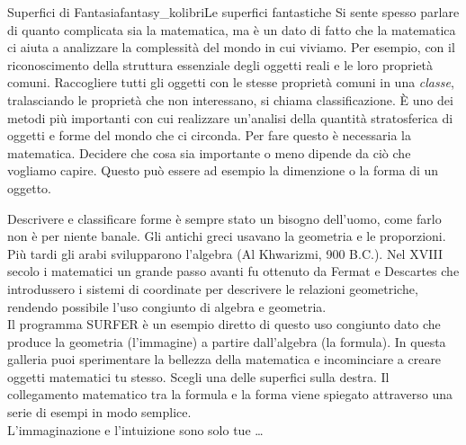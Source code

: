 \begin{surferIntroPage}{Superfici di Fantasia}{fantasy_kolibri}{Le superfici fantastiche}
Si sente spesso parlare di quanto complicata sia la matematica, ma \`e un dato di fatto che la matematica ci aiuta a analizzare la complessit\`a del mondo in cui viviamo. Per esempio, con il riconoscimento della struttura essenziale degli oggetti reali e le loro propriet\`a comuni. Raccogliere tutti gli oggetti con le stesse propriet\`a comuni in una \textit{classe}, tralasciando le propriet\`a che non interessano, si chiama classificazione. \`E uno dei metodi pi\`u importanti con cui realizzare un'analisi della quantit\`a stratosferica di oggetti e forme del mondo che ci circonda. Per fare questo \`e necessaria la matematica. Decidere che cosa sia importante o meno dipende da ci\`o che vogliamo capire. Questo pu\`o essere ad esempio la dimenzione o la forma di un oggetto.
\\

\vspace{0.4cm}

Descrivere e classificare forme \`e sempre stato un bisogno dell'uomo, come farlo non \`e per niente banale. Gli antichi greci usavano la geometria e le proporzioni. Pi\`u tardi gli arabi svilupparono l'algebra (Al Khwarizmi, 900 B.C.). Nel XVIII secolo i matematici un grande passo avanti fu ottenuto da Fermat e Descartes che introdussero i sistemi di coordinate per descrivere le relazioni geometriche, rendendo possibile l'uso congiunto di algebra e geometria.
\\
\vspace{0.4cm}
Il programma SURFER \`e un esempio diretto di questo uso congiunto dato che produce la geometria (l'immagine) a partire dall'algebra (la formula).
In questa galleria puoi sperimentare la bellezza della matematica e incominciare a creare oggetti matematici tu stesso. Scegli una delle superfici sulla destra. Il collegamento matematico tra la formula e la forma viene spiegato attraverso una serie di esempi in modo semplice.\\
L'immaginazione e l'intuizione sono solo tue \dots
\end{surferIntroPage}
